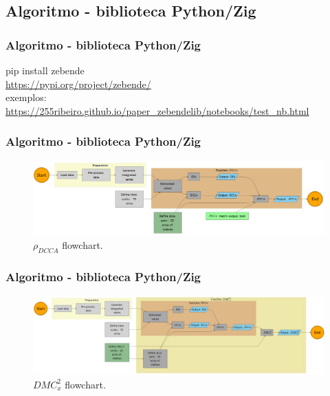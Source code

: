 \documentclass[11pt, aspectratio=169]{beamer}
\newcommand{\dmc}{\(DMC_x^2\) }
\newcommand{\pdcca}{\({\rho}_{DCCA}\) }
\begin{document}
\subsection{Algoritmo - biblioteca Python/Zig}

\begin{frame}
  \frametitle{Algoritmo - biblioteca Python/Zig}
  \begin{center}
    pip install zebende \\
    \url{https://pypi.org/project/zebende/}
    \\[10px] exemplos:\\
    \url{https://255ribeiro.github.io/paper_zebendelib/notebooks/test_nb.html}
  \end{center}

\end{frame}


\begin{frame}
  \frametitle{Algoritmo - biblioteca Python/Zig}

  \begin{figure}[!h]
    \includegraphics[width=.8\paperwidth]{../Figures/pylib/pdcca_chart.png}
    \caption{\pdcca flowchart.}
    \label{chart_01}
  \end{figure}


\end{frame}

\begin{frame}
  \frametitle{Algoritmo - biblioteca Python/Zig}

  \begin{figure}[!h]
    \includegraphics[width=.8\paperwidth]{../Figures/pylib/dmc_chart.png}
    \caption{\dmc flowchart.}
    \label{chart_02}
  \end{figure}


\end{frame}
\end{document}
